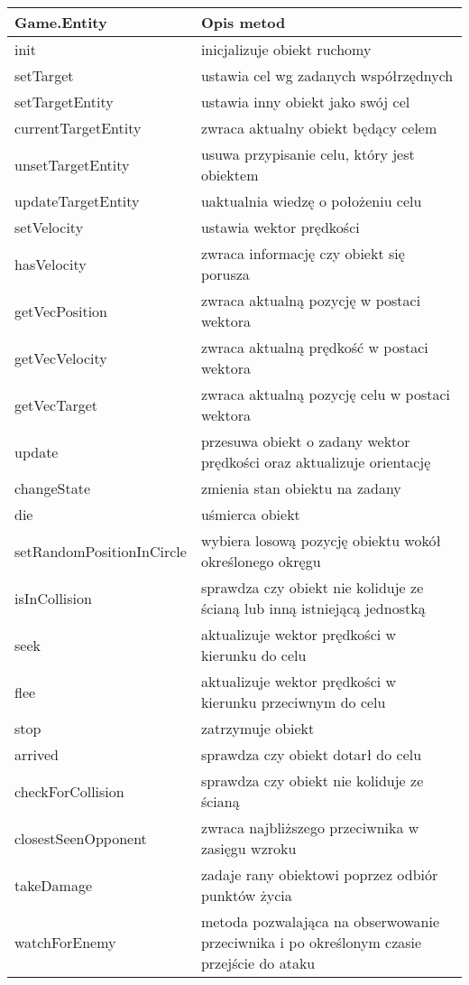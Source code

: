 \begin{table}
\begin{center}
\begin{tabular}{|p{}|p{}|}
\hline
\textbf{Game.Entity} & Opis metod\\\hline		
	init & inicjalizuje obiekt ruchomy\\
	setTarget & ustawia cel wg zadanych współrzędnych\\
	setTargetEntity & ustawia inny obiekt jako swój cel\\
	currentTargetEntity & zwraca aktualny obiekt będący celem\\
	unsetTargetEntity & usuwa przypisanie celu, który jest obiektem\\
	updateTargetEntity & uaktualnia wiedzę o położeniu celu\\
	setVelocity & ustawia wektor prędkości\\
	hasVelocity & zwraca informację czy obiekt się porusza\\
	getVecPosition & zwraca aktualną pozycję w postaci wektora\\
	getVecVelocity & zwraca aktualną prędkość w postaci wektora\\
	getVecTarget & zwraca aktualną pozycję celu w postaci wektora\\
	update & przesuwa obiekt o zadany wektor prędkości oraz aktualizuje orientację\\
	changeState & zmienia stan obiektu na zadany\\
	die & uśmierca obiekt\\
	setRandomPositionInCircle & wybiera losową pozycję obiektu wokół określonego okręgu\\
	isInCollision & sprawdza czy obiekt nie koliduje ze ścianą lub inną istniejącą jednostką\\
	seek & aktualizuje wektor prędkości w kierunku do celu\\
	flee & aktualizuje wektor prędkości w kierunku przeciwnym do celu\\
	stop & zatrzymuje obiekt\\
	arrived & sprawdza czy obiekt dotarł do celu\\
	checkForCollision & sprawdza czy obiekt nie koliduje ze ścianą\\
	closestSeenOpponent & zwraca najbliższego przeciwnika w zasięgu wzroku\\
	takeDamage & zadaje rany obiektowi poprzez odbiór punktów życia\\
	watchForEnemy & metoda pozwalająca na obserwowanie przeciwnika i po określonym czasie przejście do ataku\\

\end{tabular}
\end{center}
\end{table}
